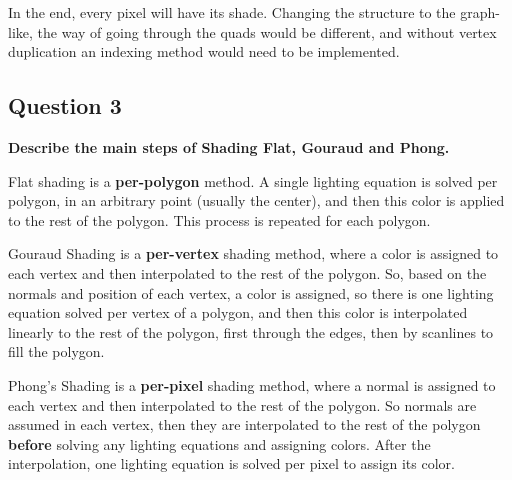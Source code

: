 \documentclass[12pt]{article}
\begin{document}
In the end, every pixel will have its shade. Changing the structure to the graph-like, the way of going through the quads would be different, and without vertex duplication an indexing method would need to be implemented.

\subsection*{Question 3}
{\bfseries Describe the main steps of Shading Flat, Gouraud and Phong.}

Flat shading is a \textbf{per-polygon} method. A single lighting equation is solved per polygon, in an arbitrary point (usually the center), and then this color is applied to the rest of the polygon. This process is repeated for each polygon.

Gouraud Shading is a \textbf{per-vertex} shading method, where a color is assigned to each vertex and then interpolated to the rest of the polygon. So, based on the normals and position of each vertex, a color is assigned, so there is one lighting equation solved per vertex of a polygon, and then this color is interpolated linearly to the rest of the polygon, first through the edges, then by scanlines to fill the polygon.

Phong's Shading is a \textbf{per-pixel} shading method, where a normal is assigned to each vertex and then interpolated to the rest of the polygon. So normals are assumed in each vertex, then they are interpolated to the rest of the polygon \textbf{before} solving any lighting equations and assigning colors. After the interpolation, one lighting equation is solved per pixel to assign its color.
\end{document}
